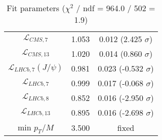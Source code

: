 \begin{table}[h!]
\begin{tabular}{c|c|c}
$\mathcal L_{CMS,7}$ & 1.053 & 0.012 (2.425 $\sigma$) \\
$\mathcal L_{CMS,13}$ & 1.020 & 0.014 (0.860 $\sigma$) \\
$\mathcal L_{LHCb,7}(J/\psi)$ & 0.981 & 0.023 (-0.532 $\sigma$) \\
$\mathcal L_{LHCb,7}$ & 0.999 & 0.017 (-0.068 $\sigma$) \\
$\mathcal L_{LHCb,8}$ & 0.852 & 0.016 (-2.950 $\sigma$) \\
$\mathcal L_{LHCb,13}$ & 0.895 & 0.016 (-2.698 $\sigma$) \\
min $p_T/M$ & 3.500 & fixed \\
\end{tabular}
\caption{Fit parameters ($\chi^2$ / ndf = 964.0 / 502 = 1.9)}
\end{table}
